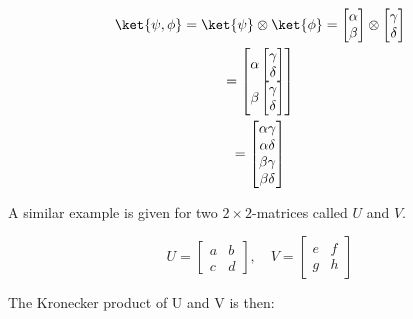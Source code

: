 \documentclass[../main.tex]{subfiles}
\begin{document}
\begin{gather*}
    \ket{\psi, \phi} = \ket{\psi} \otimes \ket{\phi} = \begin{bmatrix} \alpha \\ \beta \end{bmatrix} \otimes \begin{bmatrix} \gamma \\ \delta \end{bmatrix} \\
    = \begin{bmatrix} \alpha \begin{bmatrix} \gamma \\ \delta \end{bmatrix} \\ \beta \begin{bmatrix} \gamma \\ \delta \end{bmatrix} \end{bmatrix} \\
    = \begin{bmatrix} \alpha \gamma \\ \alpha \delta \\ \beta \gamma \\ \beta \delta \end{bmatrix}
    \label{eq: kronecker_vector}
\end{gather*}

A similar example is given for two $2 \times 2$-matrices called $U$ and $V$.

\begin{equation*}
    U = \begin{bmatrix} a & b \\ c & d  \end{bmatrix}, \quad  V = \begin{bmatrix} e & f \\ g & h  \end{bmatrix}
    \label{eq: kronecker_matrix_definition}
\end{equation*}

The Kronecker product of U and V is then:
\end{document}
